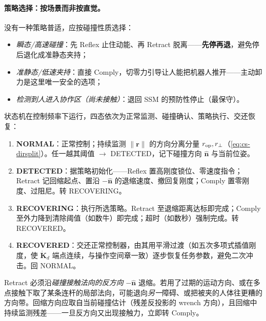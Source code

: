 \begin{finenote}
\end{finenote}

\paragraph{策略选择：按场景而非按直觉。}
没有一种策略普适，应按碰撞性质选择：
\begin{itemize}
  \item \emph{瞬态/高速碰撞}：先 Reflex 止住动能、再 Retract 脱离——\textbf{先停再退}，避免停后退化成准静态夹持；
  \item \emph{准静态/低速夹持}：直接 Comply，切零力引导让人能把机器人推开——主动卸力是这里唯一安全的选项；
  \item \emph{检测到人进入协作区（尚未接触）}：退回 SSM 的预防性停止（最保守）。
\end{itemize}

\begin{algo}\label{alg:cs-recovery}
状态机在控制频率下运行，四态依次为正常监测、碰撞确认、策略执行、交还恢复：
\begin{enumerate}
  \item \textbf{NORMAL}：正常控制；持续监测 $\|\mathbf r\|$ 的方向分离分量 $r_{\rm op},r_\perp$（\cref{eq:cs-dirsplit}）。任一越其阈值 $\to$ DETECTED，记下碰撞方向 $\hat{\mathbf n}$ 与当前位姿。
  \item \textbf{DETECTED}：据策略初始化——Reflex 置高刚度锁位、零速度指令；Retract 记回缩起点、置沿 $-\hat{\mathbf n}$ 的退缩速度、撤回复刚度；Comply 置零刚度、过阻尼。转 RECOVERING。
  \item \textbf{RECOVERING}：执行所选策略。Retract 至退缩距离达标即完成；Comply 至外力降到清除阈值（如数牛）即完成；超时（如数秒）强制完成。转 RECOVERED。
  \item \textbf{RECOVERED}：交还正常控制器，由其用平滑过渡（如五次多项式插值刚度，使 $\dot{\mathbf K}_d$ 端点连续，与操作空间章一致）逐步恢复任务参数，避免二次冲击。回 NORMAL。
\end{enumerate}
\end{algo}

\begin{pitfall}
Retract 必须沿\emph{碰撞接触法向的反方向} $-\hat{\mathbf n}$ 退缩。若用了过期的运动方向、或在多点接触下取了某条连杆的局部法向，可能退向\emph{另一}障碍、或把被夹的人体往更糟的方向带。回缩方向应取自当前碰撞估计（残差反投影的 wrench 方向），且回缩中持续监测残差——一旦反方向又出现接触力，立即转 Comply。
\end{pitfall}

